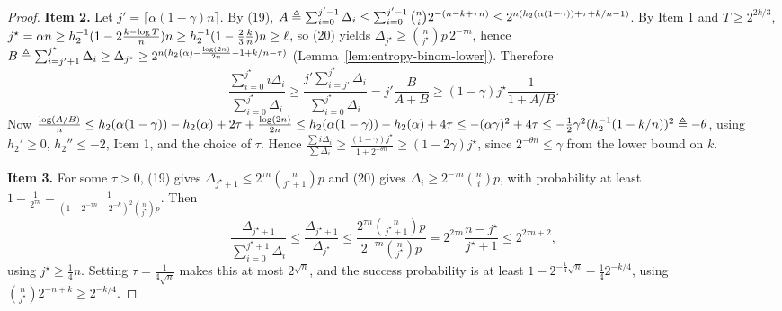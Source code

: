 \begin{proof}
  \textbf{Item 2.} Let $j' = \lceil\alpha(1 - \gamma)n\rceil$. By (19),
  $A \triangleq \sum_{i=0}^{j'-1}\Delta_i \leq \sum_{i=0}^{j'-1}\binom{n}{i}
  2^{-(n-k+\tau n)}\leq 2^{n(h_2(\alpha(1-\gamma)) + \tau + k/n - 1)}$. By Item 1
  and $T \geq 2^{2k/3}$, $j^\star = \alpha n \geq h_2^{-1}(1 - 2\frac{k-\log T}{n})
  n \geq h_2^{-1}(1 - \frac23\frac{k}{n})n \geq \ell$, so (20) yields
  $\Delta_{j^\star}\geq \binom{n}{j^\star}p\,2^{-\tau n}$, hence
  $B \triangleq \sum_{i=j'+1}^{j^\star}\Delta_i \geq \Delta_{j^\star}\geq
  2^{n(h_2(\alpha) - \frac{\log(2n)}{2n} - 1 + k/n - \tau)}$
  (Lemma~\ref{lem:entropy-binom-lower}). Therefore
  \[
    \frac{\sum_{i=0}^{j^\star} i\Delta_i}{\sum_{i=0}^{j^\star}\Delta_i}
      \geq \frac{j'\sum_{i=j'}^{j^\star}\Delta_i}{\sum_{i=0}^{j^\star}\Delta_i}
      = j'\frac{B}{A+B}\geq (1-\gamma)j^\star\frac{1}{1 + A/B}.
  \]
  Now $\frac{\log(A/B)}{n}\leq h_2(\alpha(1-\gamma)) - h_2(\alpha) + 2\tau +
  \frac{\log(2n)}{2n}\leq h_2(\alpha(1-\gamma)) - h_2(\alpha) + 4\tau \leq
  -(\alpha\gamma)^2 + 4\tau \leq -\frac12\gamma^2(h_2^{-1}(1 - k/n))^2
  \triangleq -\theta$, using $h_2'\geq 0$, $h_2''\leq -2$, Item 1, and the choice
  of $\tau$. Hence $\frac{\sum i\Delta_i}{\sum\Delta_i}\geq
  \frac{(1-\gamma)j^\star}{1 + 2^{-\theta n}}\geq (1-2\gamma)j^\star$, since
  $2^{-\theta n}\leq \gamma$ from the lower bound on $k$.

  \textbf{Item 3.} For some $\tau > 0$, (19) gives $\Delta_{j^\star+1}\leq
  2^{\tau n}\binom{n}{j^\star+1}p$ and (20) gives $\Delta_{i}\geq
  2^{-\tau n}\binom{n}{i}p$, with probability at least $1 - \frac{1}{2^{\tau n}}
  - \frac{1}{(1 - 2^{-\tau n} - 2^{-k})^2\binom{n}{j^\star}p}$. Then
  \[
    \frac{\Delta_{j^\star+1}}{\sum_{i=0}^{j^\star+1}\Delta_i}\leq
      \frac{\Delta_{j^\star+1}}{\Delta_{j^\star}}\leq
      \frac{2^{\tau n}\binom{n}{j^\star+1}p}{2^{-\tau n}\binom{n}{j^\star}p}
      = 2^{2\tau n}\frac{n - j^\star}{j^\star + 1}\leq 2^{2\tau n + 2},
  \]
  using $j^\star \geq \frac14 n$. Setting $\tau = \frac{1}{4\sqrt n}$ makes this
  at most $2^{\sqrt n}$, and the success probability is at least
  $1 - 2^{-\frac14\sqrt n} - \frac14 2^{-k/4}$, using $\binom{n}{j^\star}
  2^{-n+k}\geq 2^{-k/4}$.
\end{proof}

